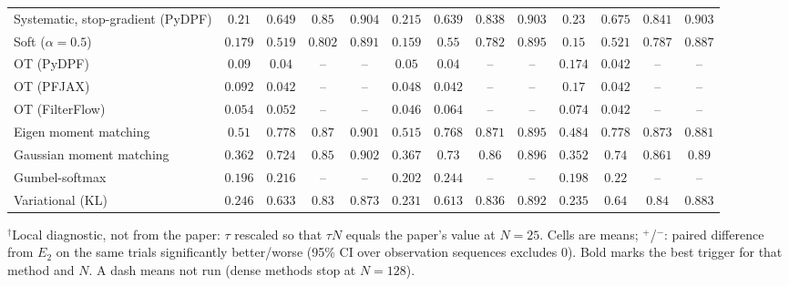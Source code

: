 \begin{table}[ht]
\begin{adjustbox}{max width=\linewidth}
\begin{tabular}{lcccc|cccc|cccc}
Systematic, stop-gradient (PyDPF) & $0.21$ & $0.649$ & $\mathbf{0.85}$ & $\mathbf{0.904}$ & $0.215$ & $0.639$ & $0.838$ & $0.903$ & $\mathbf{0.23}$ & $\mathbf{0.675}$ & $0.841$ & $0.903$ \\
Soft ($\alpha{=}0.5$) & $\mathbf{0.179}$ & $0.519$ & $\mathbf{0.802}$ & $0.891$ & $0.159$ & $\mathbf{0.55}$ & $0.782$ & $\mathbf{0.895}$ & $0.15$ & $0.521$ & $0.787$ & $0.887$ \\
OT (PyDPF) & $0.09$ & $0.04$ & -- & -- & $0.05$ & $0.04$ & -- & -- & $\mathbf{0.174}$ & $\mathbf{0.042}$ & -- & -- \\
OT (PFJAX) & $0.092$ & $\mathbf{0.042}$ & -- & -- & $0.048$ & $\mathbf{0.042}$ & -- & -- & $\mathbf{0.17}$ & $\mathbf{0.042}$ & -- & -- \\
OT (FilterFlow) & $0.054$ & $0.052$ & -- & -- & $0.046$ & $\mathbf{0.064}$ & -- & -- & $\mathbf{0.074}$ & $0.042$ & -- & -- \\
Eigen moment matching & $0.51$ & $\mathbf{0.778}$ & $0.87$ & $\mathbf{0.901}$ & $\mathbf{0.515}$ & $0.768$ & $0.871$ & $0.895$ & $0.484$ & $\mathbf{0.778}$ & $\mathbf{0.873}$ & $0.881$ \\
Gaussian moment matching & $0.362$ & $0.724$ & $0.85$ & $\mathbf{0.902}$ & $\mathbf{0.367}$ & $0.73$ & $0.86$ & $0.896$ & $0.352$ & $\mathbf{0.74}$ & $\mathbf{0.861}$ & $0.89$ \\
Gumbel-softmax & $0.196$ & $0.216$ & -- & -- & $\mathbf{0.202}$ & $\mathbf{0.244}$ & -- & -- & $0.198$ & $0.22$ & -- & -- \\
Variational (KL) & $\mathbf{0.246}$ & $0.633$ & $0.83$ & $0.873$ & $0.231$ & $0.613$ & $0.836$ & $\mathbf{0.892}$ & $0.235$ & $\mathbf{0.64}$ & $\mathbf{0.84}$ & $0.883$ \\
\bottomrule
\end{tabular}
\end{adjustbox}
\par\smallskip\parbox{0.95\linewidth}{\footnotesize $^\dagger$Local diagnostic, not from the paper: $\tau$ rescaled so that $\tau N$ equals the paper's value at $N{=}25$. Cells are means; $^{+}$/$^{-}$: paired difference from $E_2$ on the same trials significantly better/worse (95\% CI over observation sequences excludes 0). Bold marks the best trigger for that method and $N$. A dash means not run (dense methods stop at $N{=}128$).}
\end{table}

